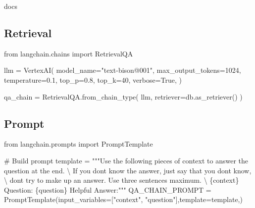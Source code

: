 \documentclass[
  letterpaper,
  DIV=11,
  numbers=noendperiod]{scrreprt}
\newenvironment{Shaded}{\begin{snugshade}}{\end{snugshade}}
\newcommand{\CharTok}[1]{\textcolor[rgb]{0.13,0.47,0.30}{#1}}
\newcommand{\CommentTok}[1]{\textcolor[rgb]{0.37,0.37,0.37}{#1}}
\newcommand{\DecValTok}[1]{\textcolor[rgb]{0.68,0.00,0.00}{#1}}
\newcommand{\FloatTok}[1]{\textcolor[rgb]{0.68,0.00,0.00}{#1}}
\newcommand{\ImportTok}[1]{\textcolor[rgb]{0.00,0.46,0.62}{#1}}
\newcommand{\NormalTok}[1]{\textcolor[rgb]{0.00,0.23,0.31}{#1}}
\newcommand{\OperatorTok}[1]{\textcolor[rgb]{0.37,0.37,0.37}{#1}}
\newcommand{\SpecialCharTok}[1]{\textcolor[rgb]{0.37,0.37,0.37}{#1}}
\newcommand{\StringTok}[1]{\textcolor[rgb]{0.13,0.47,0.30}{#1}}
\newcommand{\VariableTok}[1]{\textcolor[rgb]{0.07,0.07,0.07}{#1}}
\begin{document}
\begin{Shaded}
\begin{Highlighting}[]
\NormalTok{docs}
\end{Highlighting}
\end{Shaded}

\hypertarget{retrieval}{%
\subsection{Retrieval}\label{retrieval}}

\begin{Shaded}
\begin{Highlighting}[]
\ImportTok{from}\NormalTok{ langchain.chains }\ImportTok{import}\NormalTok{ RetrievalQA}

\NormalTok{llm }\OperatorTok{=}\NormalTok{ VertexAI(}
\NormalTok{    model\_name}\OperatorTok{=}\StringTok{"text{-}bison@001"}\NormalTok{,}
\NormalTok{    max\_output\_tokens}\OperatorTok{=}\DecValTok{1024}\NormalTok{,}
\NormalTok{    temperature}\OperatorTok{=}\FloatTok{0.1}\NormalTok{,}
\NormalTok{    top\_p}\OperatorTok{=}\FloatTok{0.8}\NormalTok{,}
\NormalTok{    top\_k}\OperatorTok{=}\DecValTok{40}\NormalTok{,}
\NormalTok{    verbose}\OperatorTok{=}\VariableTok{True}\NormalTok{,}
\NormalTok{)}

\NormalTok{qa\_chain }\OperatorTok{=}\NormalTok{ RetrievalQA.from\_chain\_type(}
\NormalTok{    llm,}
\NormalTok{    retriever}\OperatorTok{=}\NormalTok{db.as\_retriever()}
\NormalTok{)}
\end{Highlighting}
\end{Shaded}

\hypertarget{prompt}{%
\subsection{Prompt}\label{prompt}}

\begin{Shaded}
\begin{Highlighting}[]
\ImportTok{from}\NormalTok{ langchain.prompts }\ImportTok{import}\NormalTok{ PromptTemplate}

\CommentTok{\# Build prompt}
\NormalTok{template }\OperatorTok{=} \StringTok{"""Use the following pieces of context to answer the question at the end. }\CharTok{\textbackslash{}}
\StringTok{If you don\textquotesingle{}t know the answer, just say that you don\textquotesingle{}t know, }\CharTok{\textbackslash{}}
\StringTok{don\textquotesingle{}t try to make up an answer. Use three sentences maximum. }\CharTok{\textbackslash{}}
\SpecialCharTok{\{context\}}
\StringTok{Question: }\SpecialCharTok{\{question\}}
\StringTok{Helpful Answer:"""}
\NormalTok{QA\_CHAIN\_PROMPT }\OperatorTok{=}\NormalTok{ PromptTemplate(input\_variables}\OperatorTok{=}\NormalTok{[}\StringTok{"context"}\NormalTok{, }\StringTok{"question"}\NormalTok{],template}\OperatorTok{=}\NormalTok{template,)}
\end{Highlighting}
\end{Shaded}
\end{document}
